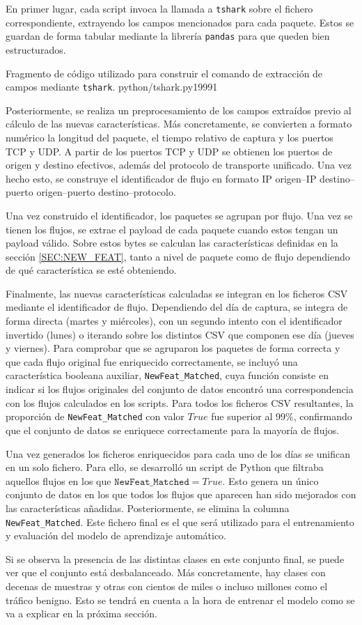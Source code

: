 En primer lugar, cada script invoca la llamada a \texttt{tshark} sobre el fichero correspondiente, extrayendo los campos mencionados para cada paquete. Estos se guardan de forma tabular mediante la librería \texttt{pandas} para que queden bien estructurados. 

{Fragmento de código utilizado para construir el comando de extracción de campos mediante \texttt{tshark}.}
{python/tshark.py}{1}{999}{1}

Posteriormente, se realiza un preprocesamiento de los campos extraídos previo al cálculo de las nuevas características. Más concretamente, se convierten a formato numérico la longitud del paquete, el tiempo relativo de captura y los puertos TCP y UDP. A partir de los puertos TCP y UDP se obtienen los puertos de origen y destino efectivos, además del protocolo de transporte unificado. Una vez hecho esto, se construye el identificador de flujo en formato IP origen–IP destino–puerto origen–puerto destino–protocolo.

Una vez construido el identificador, los paquetes se agrupan por flujo. Una vez se tienen los flujos, se extrae el payload de cada paquete cuando estos tengan un payload válido. Sobre estos bytes se calculan las características definidas en la sección \ref{SEC:NEW_FEAT}, tanto a nivel de paquete como de flujo dependiendo de qué característica se esté obteniendo.

Finalmente, las nuevas características calculadas se integran en los ficheros CSV mediante el identificador de flujo. Dependiendo del día de captura, se integra de forma directa (martes y miércoles), con un segundo intento con el identificador invertido (lunes) o iterando sobre los distintos CSV que componen ese día (jueves y viernes). Para comprobar que se agruparon los paquetes de forma correcta y que cada flujo original fue enriquecido correctamente, se incluyó una característica booleana auxiliar, \texttt{NewFeat\_Matched}, cuya función consiste en indicar si los flujos originales del conjunto de datos encontró una correspondencia con los flujos calculados en los scripts. Para todos los ficheros CSV resultantes, la proporción de \texttt{NewFeat\_Matched} con valor $True$ fue superior al 99\%, confirmando que el conjunto de datos se enriquece correctamente para la mayoría de flujos.

Una vez generados los ficheros enriquecidos para cada uno de los días se unifican en un solo fichero. Para ello, se desarrolló un script de Python que filtraba aquellos flujos en los que $\texttt{NewFeat\_Matched} = True$. Esto genera un único conjunto de datos en los que todos los flujos que aparecen han sido mejorados con las características añadidas. Posteriormente, se elimina la columna \texttt{NewFeat\_Matched}. Este fichero final es el que será utilizado para el entrenamiento y evaluación del modelo de aprendizaje automático.

Si se observa la presencia de las distintas clases en este conjunto final, se puede ver que el conjunto está desbalanceado. Más concretamente, hay clases con decenas de muestras y otras con cientos de miles o incluso millones como el tráfico benigno. Esto se tendrá en cuenta a la hora de entrenar el modelo como se va a explicar en la próxima sección.